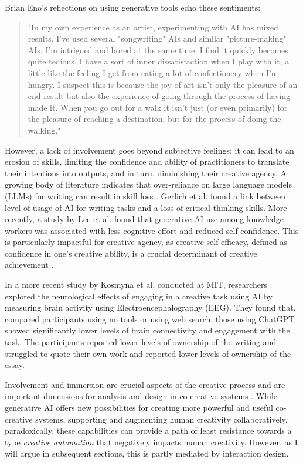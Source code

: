 Brian Eno's reflections on using generative tools echo these sentiments:

\begin{quote}
"In my own experience as an artist, experimenting with AI has mixed results. I've used several "songwriting" AIs and similar "picture-making" AIs. I'm intrigued and bored at the same time: I find it quickly becomes quite tedious. I have a sort of inner dissatisfaction when I play with it, a little like the feeling I get from eating a lot of confectionery when I'm hungry. I suspect this is because the joy of art isn't only the pleasure of an end result but also the experience of going through the process of having made it. When you go out for a walk it isn't just (or even primarily) for the pleasure of reaching a destination, but for the process of doing the walking." \cite{Eno2024-rj}
\end{quote}

However, a lack of involvement goes beyond subjective feelings; it can lead to an erosion of skills, limiting the confidence and ability of practitioners to translate their intentions into outputs, and in turn, diminishing their creative agency. A growing body of literature indicates that over-reliance on large language models (LLMs) for writing can result in skill loss \cite{Heersmink2024-mk, Rafner2021-tm}. Gerlich et al. \cite{Gerlich2025-as} found a link between level of usage of AI for writing tasks and a loss of critical thinking skills. More recently, a study by Lee et al. \cite{Lee2025-dw} found that generative AI use among knowledge workers was associated with less cognitive effort and reduced self-confidence. This is particularly impactful for creative agency, as creative self-efficacy, defined as confidence in one's creative ability, is a crucial determinant of creative achievement \cite{Tierney2002-xp}.

In a more recent study by Kosmyna et al. \cite{Kosmyna2025-cm} conducted at MIT, researchers explored the neurological effects of engaging in a creative task using AI by measuring brain activity using Electroencephalography (EEG). They found that, compared participants using no tools or using web search, those using ChatGPT showed significantly lower levels of brain connectivity and engagement with the task. The participants reported lower levels of ownership of the writing and struggled to quote their own work and reported lower levels of ownership of the essay.

Involvement and immersion are crucial aspects of the creative process \cite{Amabile1996-pt, Csikszentmihalyi1997-ui} and are important dimensions for analysis and design in co-creative systems \cite{Davis2016-te, Cherry2014-ty, Rezwana2022-ui, Clark2018-yf, Lawton2023-gd, Yuan2022-kb, Li2024-yh, Kantosalo2015-pk, Resnick2005-fs}. While generative AI offers new possibilities for creating more powerful and useful co-creative systems, supporting and augmenting human creativity collaboratively, paradoxically, these capabilities can provide a path of least resistance towards a type \textit{creative automation} that negatively impacts human creativity. However, as I will argue in subsequent sections, this is partly mediated by interaction design. 

